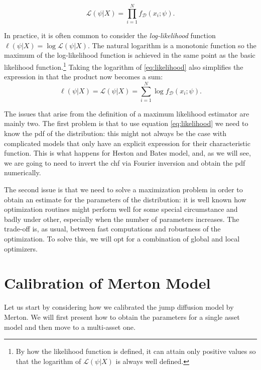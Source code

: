 \begin{equation}
\label{eq:log_likelihood}
\mathcal{L}(\psi |  X) = \prod_{i=1}^{N} f_{ \mathcal{D}}(x_{i}; \psi).
\end{equation}

In practice, it is often common to consider the \textit{log-likelihood} function $\ell(\psi |  X)  = \log \mathcal{L}(\psi |  X)$. The natural logarithm is a monotonic function so the maximum of the log-likelihood function is achieved in the same point as the basic likelihood function.\footnote{By how the likelihood function is defined, it can attain only positive values so that the logarithm of  $\mathcal{L}(\psi |  X)$ is always well defined.}
Taking the logarithm of \eqref{eq:likelihood} also simplifies the expression in that the product now becomes a sum:
\begin{equation}
\label{eq:likelihood}
\ell (\psi |  X) =\mathcal{L}(\psi |  X) = \sum_{i=1}^{N} \log f_{ \mathcal{D}}(x_{i}; \psi).
\end{equation}

The issues that arise from the definition of a maximum likelihood estimator are mainly two.
The first problem is that to use equation \eqref{eq:likelihood} we need to know the pdf of the distribution: this might not always be the case with complicated models that only have an explicit expression for their characteristic function. This is what happens for Heston and Bates model, and, as we will see, we are going to need to invert the chf via Fourier inversion and obtain the pdf numerically.

The second issue is that we need to solve a maximization problem in order to obtain an estimate for the parameters of the distribution: it is well known how optimization routines might perform well for some special circumstance and badly under other, especially when the number of parameters increases. The trade-off is, as usual, between fast computations and robustness of the optimization. To solve this, we will opt for a combination of global and local optimizers.




\bigskip
\section{Calibration of Merton Model}
\label{sec:merton_cal}
Let us start by considering how we calibrated the jump diffusion model by Merton. 
We will first present how to obtain the parameters for a single asset model and then move to a multi-asset one.



